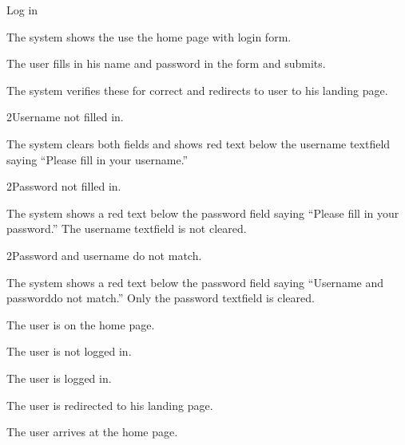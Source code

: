 
\begin{uc}{Log in}

    \begin{uc-mss}
    \item The system shows the use the home page with login form.
    \item The user fills in his name and password in the form and submits.
    \item The system verifies these for correct and redirects to user to his
        landing page.
    \end{uc-mss}

    \begin{uc-ext}

        \begin{uc-fail}{2}{Username not filled in.}
        \item The system clears both fields and shows red text below the
            username textfield saying ``Please fill in your username.''
        \end{uc-fail}

        \begin{uc-fail}{2}{Password not filled in.}
        \item The system shows a red text below the password field saying
            ``Please fill in your password.'' The username textfield is not
            cleared.
        \end{uc-fail}

        \begin{uc-fail}{2}{Password and username do not match.}
        \item The system shows a red text below the password field saying
            ``Username and passworddo not match.'' Only the password textfield
            is cleared.
        \end{uc-fail}

    \end{uc-ext}

    \begin{uc-pre}
    \item The user is on the home page.
    \item The user is not logged in.
    \end{uc-pre}

    \begin{uc-post}
    \item The user is logged in.
    \item The user is redirected to his landing page.
    \end{uc-post}

    \begin{uc-trig}
        The user arrives at the home page.
    \end{uc-trig}

\end{uc}

